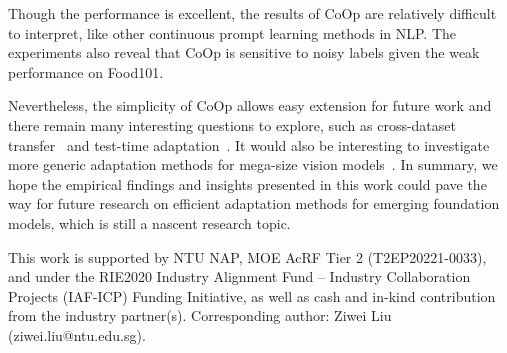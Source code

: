 Though the performance is excellent, the results of CoOp are relatively difficult to interpret, like other continuous prompt learning methods in NLP. The experiments also reveal that CoOp is sensitive to noisy labels given the weak performance on Food101.

Nevertheless, the simplicity of CoOp allows easy extension for future work and there remain many interesting questions to explore, such as cross-dataset transfer~\citep{zhou2022conditional} and test-time adaptation~\citep{wang2020tent}. It would also be interesting to investigate more generic adaptation methods for mega-size vision models~\citep{jia2022visual,bahng2022visual,gao2021clip}. In summary, we hope the empirical findings and insights presented in this work could pave the way for future research on efficient adaptation methods for emerging foundation models, which is still a nascent research topic.

\begin{acknowledgements}
This work is supported by NTU NAP, MOE AcRF Tier 2 (T2EP20221-0033), and under the RIE2020 Industry Alignment Fund – Industry Collaboration Projects (IAF-ICP) Funding Initiative, as well as cash and in-kind contribution from the industry partner(s).
Corresponding author: Ziwei Liu (ziwei.liu@ntu.edu.sg).
\end{acknowledgements}

